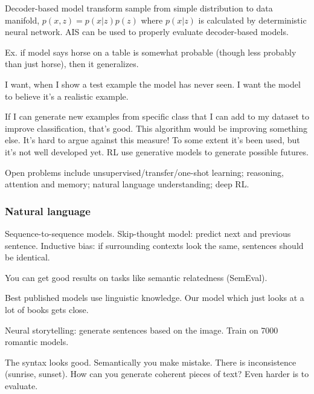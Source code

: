 
Decoder-based model transform sample from simple distribution to data manifold, $p(x,z) = p(x|z)p(z)$ where $p(x|z)$ is calculated by deterministic neural network. AIS can be used to properly evaluate decoder-based models. 


Ex. if model says horse on a table is somewhat probable (though less probably than just horse), then it generalizes.

I want, when I show a test example the model has never seen. I want the model to believe it's a realistic example.

If I can generate new examples  from specific class that I can add to my dataset to improve classification, that's good. This algorithm would be improving something else. It's hard to argue against this measure! To some extent it's been used, but it's not well developed yet.
RL use generative models to generate possible futures. %


Open problems include unsupervised/transfer/one-shot learning; reasoning, attention and memory; natural language understanding; deep RL.

\subsubsection{Natural language}
Sequence-to-sequence models. Skip-thought model: predict next and previous sentence.  Inductive bias: if surrounding  contexts look the same, sentences should be identical.


You can get good results on tasks like semantic relatedness (SemEval). %

Best published models use linguistic knowledge. Our model which just looks at a lot of books gets close.

Neural storytelling: generate sentences based on the image.
Train on 7000 romantic models.

The syntax looks good. Semantically you make mistake. There is inconsistence (sunrise, sunset). How can you generate coherent pieces of text? Even harder is to evaluate.

